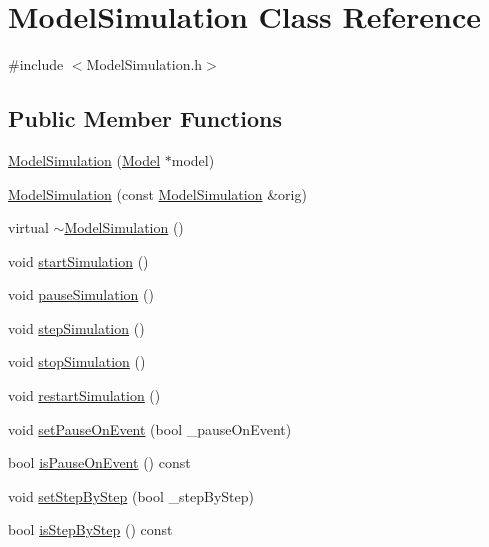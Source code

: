 \hypertarget{class_model_simulation}{}\section{Model\+Simulation Class Reference}
\label{class_model_simulation}


{\ttfamily \#include $<$Model\+Simulation.\+h$>$}

\subsection*{Public Member Functions}
\begin{DoxyCompactItemize}
\item 
\hyperlink{class_model_simulation_a273434a2086791805d46aef9afadd24d}{Model\+Simulation} (\hyperlink{class_model}{Model} $\ast$model)
\item 
\hyperlink{class_model_simulation_a5858ba409b91834ee922985d1ccd8feb}{Model\+Simulation} (const \hyperlink{class_model_simulation}{Model\+Simulation} \&orig)
\item 
virtual \hyperlink{class_model_simulation_a9ca43a1faf5b4f3bc4f4934024e4d5f1}{$\sim$\+Model\+Simulation} ()
\item 
void \hyperlink{class_model_simulation_a22ea961f3242d4466dc0cf392c66d5e9}{start\+Simulation} ()
\item 
void \hyperlink{class_model_simulation_a6ceaa12581ed433b97452958dfd3371b}{pause\+Simulation} ()
\item 
void \hyperlink{class_model_simulation_a68e02df4b71756d360ca0e25464447be}{step\+Simulation} ()
\item 
void \hyperlink{class_model_simulation_a8ee10a8bee6b90b91aba1c5ee62f0f36}{stop\+Simulation} ()
\item 
void \hyperlink{class_model_simulation_a0fd9ccdaf26dbf79daedfece08d9f0ea}{restart\+Simulation} ()
\item 
void \hyperlink{class_model_simulation_a1af329d915189bd4f295d9d1439c0fd1}{set\+Pause\+On\+Event} (bool \+\_\+pause\+On\+Event)
\item 
bool \hyperlink{class_model_simulation_a8874f4dfce1800cdce2e9ee68193f1c2}{is\+Pause\+On\+Event} () const 
\item 
void \hyperlink{class_model_simulation_a20102be83bb5d73e0ba56896e7df8e4e}{set\+Step\+By\+Step} (bool \+\_\+step\+By\+Step)
\item 
bool \hyperlink{class_model_simulation_af50016a6b4a066cca6194c0c0a3349e7}{is\+Step\+By\+Step} () const 

\end{DoxyCompactItemize}
